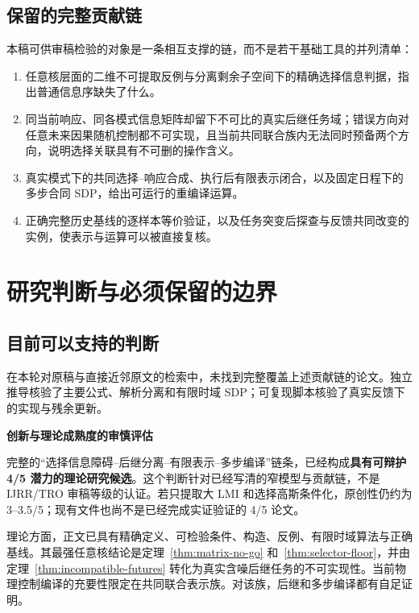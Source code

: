 \documentclass[UTF8,fontset=fandol,11pt,a4paper]{ctexart}
\theoremstyle{definition}
\theoremstyle{remark}
\numberwithin{equation}{section}
\begin{document}
\subsection{保留的完整贡献链}
本稿可供审稿检验的对象是一条相互支撑的链，而不是若干基础工具的并列清单：
\begin{enumerate}
\item 任意核层面的二维不可提取反例与分离剩余子空间下的精确选择信息判据，指出普通信息序缺失了什么。
\item 同当前响应、同各模式信息矩阵却留下不可比的真实后继任务域；错误方向对任意未来因果随机控制都不可实现，且当前共同联合族内无法同时预备两个方向，说明选择关联具有不可删的操作含义。
\item 真实模式下的共同选择--响应合成、执行后有限表示闭合，以及固定日程下的多步合同 SDP，给出可运行的重编译运算。
\item 正确完整历史基线的逐样本等价验证，以及任务突变后探查与反馈共同改变的实例，使表示与运算可以被直接复核。
\end{enumerate}

\section{研究判断与必须保留的边界}
\label{sec:verdict}

\subsection{目前可以支持的判断}
在本轮对原稿与直接近邻原文的检索中，未找到完整覆盖上述贡献链的论文。独立推导核验了主要公式、解析分离和有限时域 SDP；可复现脚本核验了真实反馈下的实现与残余更新。

\begin{keybox}
\textbf{创新与理论成熟度的审慎评估}\par
完整的“选择信息障碍--后继分离--有限表示--多步编译”链条，已经构成\textbf{具有可辩护 4/5 潜力的理论研究候选}。这个判断针对已经写清的窄模型与贡献链，不是 IJRR/TRO 审稿等级的认证。若只提取大 LMI 和选择高斯条件化，原创性仍约为 3--3.5/5；现有文件也尚不是已经完成实证验证的 4/5 论文。
\end{keybox}

理论方面，正文已具有精确定义、可检验条件、构造、反例、有限时域算法与正确基线。其最强任意核结论是定理~\ref{thm:matrix-no-go} 和~\ref{thm:selector-floor}，并由定理~\ref{thm:incompatible-futures} 转化为真实含噪后继任务的不可实现性。当前物理控制编译的充要性限定在共同联合表示族。对该族，后继和多步编译都有自足证明。
\end{document}
